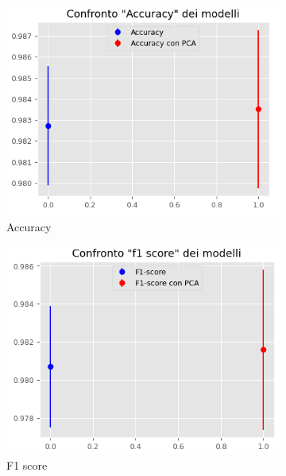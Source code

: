 \begin{figure}[!ht]
    \centering
    \begin{subfigure}[b]{0.4\textwidth}
        \centering
        \includegraphics[width=\textwidth]{img/rete/intervalliAcc.png}
        \caption{Accuracy}
        \label{fig:acc}
    \end{subfigure}
    \hfill
    \begin{subfigure}[b]{0.4\textwidth}
        \centering
        \includegraphics[width=\textwidth]{img/rete/intervalliF1.png}
        \caption{F1 score}
        \label{fig:f1}
    \end{subfigure}
    \hfill
    \begin{subfigure}[b]{0.4\textwidth}

\end{subfigure}
\end{figure}
